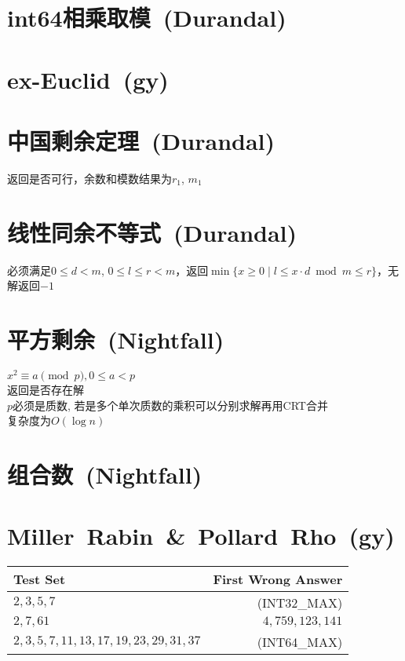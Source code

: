 \section{int64相乘取模\ \small(Durandal)}
\section{ex-Euclid\ \small(gy)}
\section{中国剩余定理\ \small(Durandal)}
	返回是否可行，余数和模数结果为$ r_1 $, $ m_1 $
\section{线性同余不等式\ \small(Durandal)}
	必须满足$ 0 \leq d < m $, $ 0 \leq l \leq r < m $，返回$ \min\lbrace x \geq 0 \mid l \leq x \cdot d \bmod m \leq r \rbrace $，无解返回$ -1 $ 
\section{平方剩余\ \small(Nightfall)}
	$ x^2 \equiv a \pmod p, 0 \leq a < p $
	\\返回是否存在解
	\\$ p $必须是质数, 若是多个单次质数的乘积可以分别求解再用CRT合并
	\\复杂度为$ O(\log n) $
\section{组合数\ \small(Nightfall)}
\section{Miller\ Rabin\ \&\ Pollard\ Rho\ \small(gy)}
	\begin{tabular}{l r}
		\hline
		Test Set & First Wrong Answer\\\hline
		$ 2, 3, 5, 7 $ & (INT32\_MAX)\\\hline
		$ 2, 7, 61 $ & $ 4,759,123,141 $\\\hline
		$ 2, 3, 5, 7, 11, 13, 17, 19, 23, 29, 31, 37 $ & (INT64\_MAX)\\\hline
	\end{tabular}
